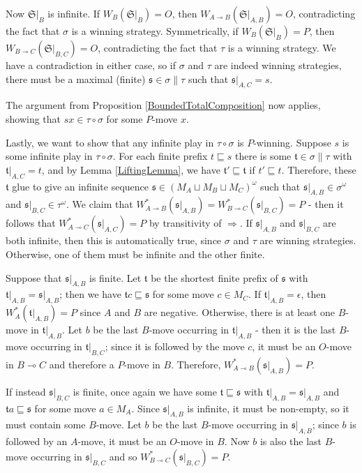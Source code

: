 \documentclass[11pt]{article} %
\theoremstyle{plain} %
\theoremstyle{definition} %
\theoremstyle{note}
\theoremstyle{exercisestyle}
\renewcommand{\implies}{\multimap}
\newcommand{\comp}[2]{#1 \circ #2}
\newcommand{\cprd}{\sqcup}
\newcommand{\s}{\mathfrak s}
\renewcommand{\t}{\mathfrak t}
\newcommand{\emptyplay}{\epsilon}
\newcommand{\prefix}{\sqsubseteq}
\renewcommand{\S}{{\mathfrak{S}}}
\begin{document}
Now $\S\vert_B$ is infinite.  If $W_B(\S\vert_B)=O$, then $W_{A\implies B}(\S\vert_{A,B})=O$, contradicting the fact that $\sigma$ is a winning strategy.  Symmetrically, if $W_B(\S\vert_B)=P$, then $W_{B\implies C}(\S\vert_{B,C})=O$, contradicting the fact that $\tau$ is a winning strategy.  We have a contradiction in either case, so if $\sigma$ and $\tau$ are indeed winning strategies, there must be a maximal (finite) $\s\in\sigma\|\tau$ such that $\s\vert_{A,C}=s$.  

The argument from Proposition \ref{BoundedTotalComposition} now applies, showing that $sx\in\comp\tau\sigma$ for some $P$-move $x$.  

Lastly, we want to show that any infinite play in $\comp\tau\sigma$ is $P$-winning.  Suppose $s$ is some infinite play in $\comp\tau\sigma$.  For each finite prefix $t\prefix s$ there is some $\t\in\sigma\|\tau$ with $\t\vert_{A,C}=t$, and by Lemma \ref{LiftingLemma}, we have $\t'\prefix\t$ if $t'\prefix t$.  Therefore, these $\t$ glue to give an infinite sequence $\s\in(M_A\cprd M_B\cprd M_C)^\omega$ such that $\s\vert_{A,B}\in\sigma^\omega$ and $\s\vert_{B,C}\in\tau^\omega$.  We claim that $W_{A\implies B}^*(\s\vert_{A,B})=W_{B\implies C}^*(\s\vert_{B,C})=P$ - then it follows that $W_{A\implies C}^*(\s\vert_{A,C})=P$ by transitivity of $\Rightarrow$.  If $\s\vert_{A,B}$ and $\s\vert_{B,C}$ are both infinite, then this is automatically true, since $\sigma$ and $\tau$ are winning strategies.  Otherwise, one of them must be infinite and the other finite.  

Suppose that $\s\vert_{A,B}$ is finite.  Let $\t$ be the shortest finite prefix of $\s$ with $\t\vert_{A,B}=\s\vert_{A,B}$; then we have $\t c\prefix \s$ for some move $c\in M_C$.  If $\t\vert_{A,B}=\emptyplay$, then $W_A^*(\t\vert_{A,B})=P$ since $A$ and $B$ are negative.  Otherwise, there is at least one $B$-move in $\t\vert_{A,B}$.  Let $b$ be the last $B$-move occurring in $\t\vert_{A,B}$ - then it is the last $B$-move occurring in $\t\vert_{B,C}$; since it is followed by the move $c$, it must be an $O$-move in $B\implies C$ and therefore a $P$-move in $B$.  Therefore, $W_{A\implies B}^*(\s\vert_{A,B})=P$.  

If instead $\s\vert_{B,C}$ is finite, once again we have some $\t\prefix\s$ with $\t\vert_{A,B}=\s\vert_{A,B}$ and $\t a\prefix\s$ for some move $a\in M_A$.  Since $\s\vert_{A,B}$ is infinite, it must be non-empty, so it must contain some $B$-move.  Let $b$ be the last $B$-move occurring in $\s\vert_{A,B}$; since $b$ is followed by an $A$-move, it must be an $O$-move in $B$.  Now $b$ is also the last $B$-move occurring in $\s\vert_{B,C}$ and so $W_{B\implies C}^*(\s\vert_{B,C})=P$.



\end{document}
